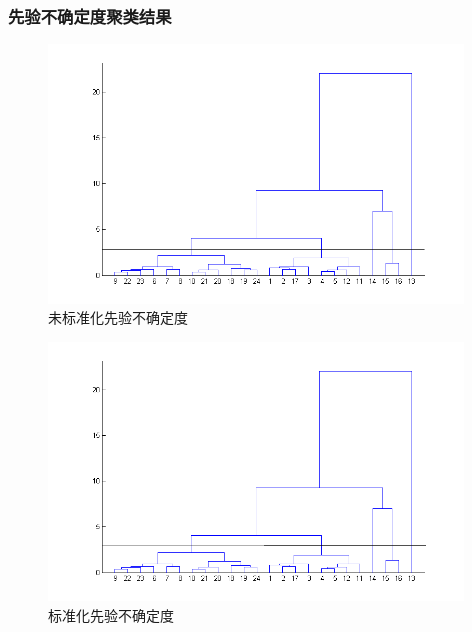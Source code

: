 \documentclass{beamer}
\begin{document}
\begin{CJK}{UTF8}{gkai}
\begin{frame}
\frametitle{先验不确定度聚类结果}
\begin{figure}
\centering
\includegraphics[width=11cm]{unzscore.png}
\caption{未标准化先验不确定度}
\end{figure}
\end{frame}

\begin{frame}
\begin{figure}
\centering
\includegraphics[width=11cm]{zscore.png}
\caption{标准化先验不确定度}
\end{figure}
\end{frame}




\end{CJK}
\end{document}
